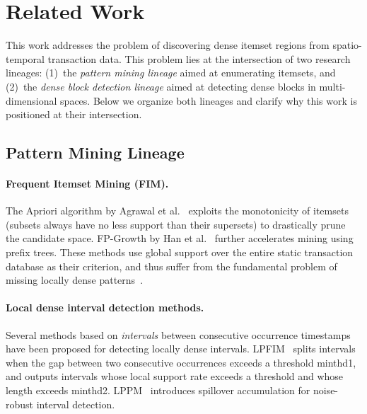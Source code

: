 \section{Related Work}\label{sec:related}

This work addresses the problem of discovering
dense itemset regions from spatio-temporal transaction data.
This problem lies at the intersection of two research lineages:
(1)~the \emph{pattern mining lineage} aimed at enumerating itemsets, and
(2)~the \emph{dense block detection lineage} aimed at detecting
dense blocks in multi-dimensional spaces.
Below we organize both lineages and clarify
why this work is positioned at their intersection.

\subsection{Pattern Mining Lineage}

\paragraph{Frequent Itemset Mining (FIM).}
The Apriori algorithm by Agrawal et al.~\cite{agrawal1994apriori}
exploits the monotonicity of itemsets
(subsets always have no less support than their supersets)
to drastically prune the candidate space.
FP-Growth by Han et al.~\cite{han2000mining}
further accelerates mining using prefix trees.
These methods use global support over the entire
static transaction database as their criterion,
and thus suffer from the fundamental problem
of missing locally dense patterns~\cite{aprioriwindow}.

\paragraph{Local dense interval detection methods.}
Several methods based on \emph{intervals} between consecutive
occurrence timestamps have been proposed
for detecting locally dense intervals.
LPFIM~\cite{mahanta2005lpfim} splits intervals
when the gap between two consecutive occurrences exceeds
a threshold minthd1, and outputs intervals
whose local support rate exceeds a threshold
and whose length exceeds minthd2.
LPPM~\cite{fournierviger2021lppm} introduces
spillover accumulation for noise-robust interval detection.

